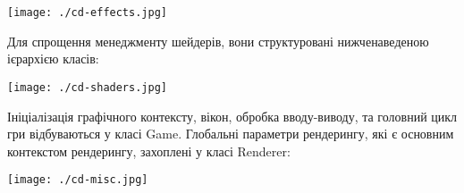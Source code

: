 \begin{center}
  \texttt{[image: ./cd-effects.jpg]}
\end{center}

Для спрощення менеджменту шейдерів, вони структуровані нижченаведеною ієрархією класів:

\begin{center}
  \texttt{[image: ./cd-shaders.jpg]}
\end{center}

Ініціалізація графічного контексту, вікон, обробка вводу-виводу, та головний цикл гри відбуваються у класі Game. Глобальні параметри рендерингу, які є основним контекстом рендерингу, захоплені у класі Renderer:

\begin{center}
  \texttt{[image: ./cd-misc.jpg]}
\end{center}